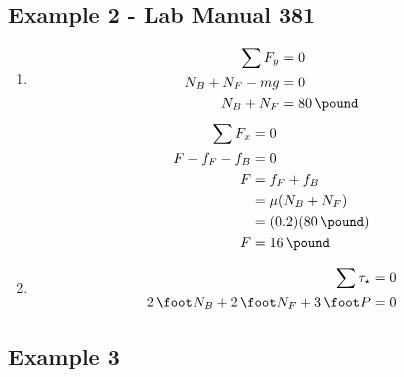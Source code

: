 \documentclass{article}
\begin{document}
\hr

\subsection{Example 2 - Lab Manual 381} \label{example:2}
\begin{enumerate}[label=\textbf{(\alph*)}]
\item
	\begin{align}
		\sum F_y & = 0 \\
		N_B + N_F - mg & = 0 \\
		N_B + N_F & = \SI{80}{\pound}
	\end{align}
	\begin{align}
		\sum F_x & = 0 \\
		F - f_F - f_B & = 0 \\
		F & = f_F + f_B \\
		  & = \mu(N_B + N_F) \\
		  & = (0.2)(\SI{80}{\pound}) \\
		F & = \SI{16}{\pound}
	\end{align}
\item
	\begin{align}
		\sum \tau_\star & = 0 \\
		\SI{2}{\foot}N_B + \SI{2}{\foot}N_F + \SI{3}{\foot}P & = 0
	\end{align}
\end{enumerate}

\hr

\subsection{Example 3} \label{example:3}
\end{document}
